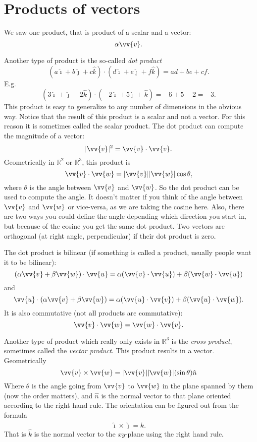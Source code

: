 \documentclass[11pt]{article}
\newcommand{\sabs}[1]{\lvert {#1} \rvert}
\newcommand{\R}{{\mathbb{R}}}
\newcommand{\veci}{\hat{\imath}}
\newcommand{\vecj}{\hat{\jmath}}
\newcommand{\veck}{\hat{k}}
\begin{document}

\section{Products of vectors}

We saw one product, that is product of a scalar and a vector:
$$
\alpha \vv{v}.
$$

Another type of product is the so-called \emph{dot product}
$$
( a \veci + b \vecj + c \veck ) \cdot
( d \veci + e \vecj + f \veck ) =
ad + be + cf .
$$
E.g.
$$
( 3 \veci + \vecj -2 \veck ) \cdot
( - 2\veci + 5 \vecj + \veck ) =
-6 + 5 -2 = -3 .
$$
This product is easy to generalize to any number of dimensions in the obvious way.
Notice that the result of this product is a scalar and not a vector.
For this reason it is sometimes called the scalar product.
The dot product can compute the magnitude of a vector:
$$
\sabs{\vv{v}}^2 = \vv{v} \cdot \vv{v} .
$$
Geometrically in $\R^2$ or $\R^3$, this product is
$$
\vv{v} \cdot \vv{w} = \sabs{\vv{v}} \sabs{\vv{w}} \cos \theta ,
$$
where $\theta$ is the angle between $\vv{v}$ and $\vv{w}$.
So the dot product can be used to compute the angle.
It doesn't matter if you think of the angle
between $\vv{v}$ and $\vv{w}$ or vice-versa, as we are taking the cosine here.
Also, there are two ways you could define the angle depending which direction you start in,
but because of the cosine you get the same dot product.
Two vectors are orthogonal
(at right angle, perpendicular) if their dot product is zero.

The dot product is bilinear (if something is called a product, usually people want it to be bilinear):
$$
( \alpha \vv{v} + \beta \vv{w} ) \cdot \vv{u}
=
\alpha (\vv{v} \cdot \vv{u}) + \beta (\vv{w} \cdot \vv{u})
$$
and
$$
\vv{u} \cdot
( \alpha \vv{v} + \beta \vv{w} )
=
\alpha (\vv{u} \cdot \vv{v}) + \beta (\vv{u} \cdot \vv{w}) .
$$
It is also commutative (not all products are commutative):
$$
\vv{v} \cdot \vv{w} = \vv{w} \cdot \vv{v} .
$$

Another type of product which really only exists in $\R^3$ is the
\emph{cross product},
sometimes called the \emph{vector product}.
This product results in a vector.
Geometrically
$$
\vv{v} \times \vv{w} = \sabs{\vv{v}} \sabs{\vv{w}} (\sin \theta) \hat{n}
$$
Where $\theta$ is the angle going from $\vv{v}$ to $\vv{w}$ in the plane spanned by them
(now the order matters),
and $\hat{n}$ is the normal vector to that plane oriented according to the right hand rule.
The orientation can be figured out from the formula
$$
\veci \times \vecj = \veck .
$$
That is $\veck$ is the normal vector to the $xy$-plane using the right hand rule.
\end{document}
